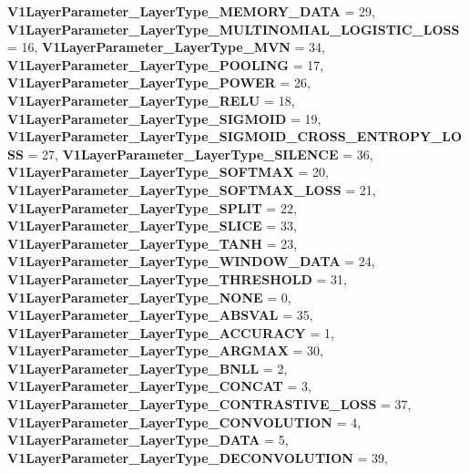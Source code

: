 \begin{DoxyCompactItemize}
\newline
{\bfseries V1\+Layer\+Parameter\+\_\+\+Layer\+Type\+\_\+\+M\+E\+M\+O\+R\+Y\+\_\+\+D\+A\+TA} = 29, 
{\bfseries V1\+Layer\+Parameter\+\_\+\+Layer\+Type\+\_\+\+M\+U\+L\+T\+I\+N\+O\+M\+I\+A\+L\+\_\+\+L\+O\+G\+I\+S\+T\+I\+C\+\_\+\+L\+O\+SS} = 16, 
{\bfseries V1\+Layer\+Parameter\+\_\+\+Layer\+Type\+\_\+\+M\+VN} = 34, 
{\bfseries V1\+Layer\+Parameter\+\_\+\+Layer\+Type\+\_\+\+P\+O\+O\+L\+I\+NG} = 17, 
\newline
{\bfseries V1\+Layer\+Parameter\+\_\+\+Layer\+Type\+\_\+\+P\+O\+W\+ER} = 26, 
{\bfseries V1\+Layer\+Parameter\+\_\+\+Layer\+Type\+\_\+\+R\+E\+LU} = 18, 
{\bfseries V1\+Layer\+Parameter\+\_\+\+Layer\+Type\+\_\+\+S\+I\+G\+M\+O\+ID} = 19, 
{\bfseries V1\+Layer\+Parameter\+\_\+\+Layer\+Type\+\_\+\+S\+I\+G\+M\+O\+I\+D\+\_\+\+C\+R\+O\+S\+S\+\_\+\+E\+N\+T\+R\+O\+P\+Y\+\_\+\+L\+O\+SS} = 27, 
\newline
{\bfseries V1\+Layer\+Parameter\+\_\+\+Layer\+Type\+\_\+\+S\+I\+L\+E\+N\+CE} = 36, 
{\bfseries V1\+Layer\+Parameter\+\_\+\+Layer\+Type\+\_\+\+S\+O\+F\+T\+M\+AX} = 20, 
{\bfseries V1\+Layer\+Parameter\+\_\+\+Layer\+Type\+\_\+\+S\+O\+F\+T\+M\+A\+X\+\_\+\+L\+O\+SS} = 21, 
{\bfseries V1\+Layer\+Parameter\+\_\+\+Layer\+Type\+\_\+\+S\+P\+L\+IT} = 22, 
\newline
{\bfseries V1\+Layer\+Parameter\+\_\+\+Layer\+Type\+\_\+\+S\+L\+I\+CE} = 33, 
{\bfseries V1\+Layer\+Parameter\+\_\+\+Layer\+Type\+\_\+\+T\+A\+NH} = 23, 
{\bfseries V1\+Layer\+Parameter\+\_\+\+Layer\+Type\+\_\+\+W\+I\+N\+D\+O\+W\+\_\+\+D\+A\+TA} = 24, 
{\bfseries V1\+Layer\+Parameter\+\_\+\+Layer\+Type\+\_\+\+T\+H\+R\+E\+S\+H\+O\+LD} = 31, 
\newline
{\bfseries V1\+Layer\+Parameter\+\_\+\+Layer\+Type\+\_\+\+N\+O\+NE} = 0, 
{\bfseries V1\+Layer\+Parameter\+\_\+\+Layer\+Type\+\_\+\+A\+B\+S\+V\+AL} = 35, 
{\bfseries V1\+Layer\+Parameter\+\_\+\+Layer\+Type\+\_\+\+A\+C\+C\+U\+R\+A\+CY} = 1, 
{\bfseries V1\+Layer\+Parameter\+\_\+\+Layer\+Type\+\_\+\+A\+R\+G\+M\+AX} = 30, 
\newline
{\bfseries V1\+Layer\+Parameter\+\_\+\+Layer\+Type\+\_\+\+B\+N\+LL} = 2, 
{\bfseries V1\+Layer\+Parameter\+\_\+\+Layer\+Type\+\_\+\+C\+O\+N\+C\+AT} = 3, 
{\bfseries V1\+Layer\+Parameter\+\_\+\+Layer\+Type\+\_\+\+C\+O\+N\+T\+R\+A\+S\+T\+I\+V\+E\+\_\+\+L\+O\+SS} = 37, 
{\bfseries V1\+Layer\+Parameter\+\_\+\+Layer\+Type\+\_\+\+C\+O\+N\+V\+O\+L\+U\+T\+I\+ON} = 4, 
\newline
{\bfseries V1\+Layer\+Parameter\+\_\+\+Layer\+Type\+\_\+\+D\+A\+TA} = 5, 
{\bfseries V1\+Layer\+Parameter\+\_\+\+Layer\+Type\+\_\+\+D\+E\+C\+O\+N\+V\+O\+L\+U\+T\+I\+ON} = 39, 

\end{DoxyCompactItemize}
